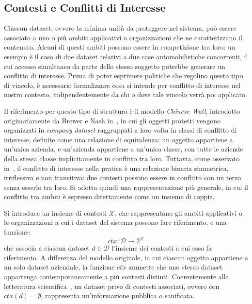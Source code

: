 \subsection{Contesti e Conflitti di Interesse}
\label{subsec:contesti_conflitto}

Ciascun dataset, ovvero la minima unità da proteggere nel sistema, può essere associato a uno o più ambiti applicativi o organizzazioni che ne caratterizzano il contenuto. Alcuni di questi ambiti possono essere in competizione tra loro: un esempio è il caso di due dataset relativi a due case automobilistiche concorrenti, il cui accesso simultaneo da parte dello stesso soggetto potrebbe generare un conflitto di interesse. Prima di poter esprimere politiche che regolino questo tipo di vincolo, è necessario formalizzare cosa si intende per conflitto di interesse nel nostro contesto, indipendentemente da chi o dove tale vincolo verrà poi applicato.

Il riferimento per questo tipo di struttura è il modello \emph{Chinese Wall}, introdotto originariamente da Brewer e Nash in~\cite{chinese-wall-brewer-nash}, in cui gli oggetti protetti vengono organizzati in \emph{company dataset} raggruppati a loro volta in classi di conflitto di interesse, definite come una relazione di equivalenza: un oggetto appartiene a un'unica azienda, e un'azienda appartiene a un'unica classe, con tutte le aziende della stessa classe implicitamente in conflitto tra loro. Tuttavia, come osservato in~\cite{chinese-wall-aggressive-lin}, il conflitto di interesse nella pratica è una relazione binaria simmetrica, irriflessiva e non transitiva: due contesti possono essere in conflitto con un terzo senza esserlo tra loro. Si adotta quindi una rappresentazione più generale, in cui il conflitto tra ambiti è espresso direttamente come un insieme di coppie.

Si introduce un insieme di contesti $\mathcal{X}$, che rappresentano gli ambiti applicativi o le organizzazioni a cui i dataset del sistema possono fare riferimento, e una funzione:
\begin{equation}
    ctx: \mathcal{D} \rightarrow 2^{\mathcal{X}}
\end{equation}
che associa a ciascun dataset $d \in \mathcal{D}$ l'insieme dei contesti a cui esso fa riferimento. A differenza del modello originale, in cui ciascun oggetto appartiene a un solo dataset aziendale, la funzione $ctx$ ammette che uno stesso dataset appartenga contemporaneamente a più contesti distinti. Coerentemente alla letteratura scientifica~\cite{chinese-wall-brewer-nash, chinese-wall-kessler}, un dataset privo di contesti associati, ovvero con $ctx(d) = \emptyset$, rappresenta un'informazione pubblica o sanificata.

